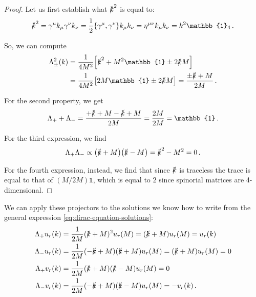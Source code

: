 \documentclass[main.tex]{subfiles}
\begin{document}
\begin{proof}
Let us first establish what \(\slashed{k}^2\) is equal to: 
%
\begin{align}
\slashed{k}^2 =
\gamma^{\mu } k_{\mu } \gamma^{\nu } k_{\nu }
= \frac{1}{2} \qty{\gamma^{\mu }, \gamma^{\nu }}k_{\mu } k_{\nu }
= \eta^{\mu \nu } k_{\mu } k_{\nu }
= k^2 \mathbb{1}_{4}
\,.
\end{align}

So, we can compute 
%
\begin{align}
\Lambda_{\pm}^2 (k) &= \frac{1}{4 M^2}\qty[\slashed{k}^2 + M^2 \mathbb{1} \pm 2 \slashed{k} M]  \\
&= \frac{1}{4 M^2} \qty[2 M \mathbb{1} \pm 2 \slashed{k}M] = \frac{\pm \slashed{k} + M}{2M}
\,.
\end{align}

For the second property, we get 
%
\begin{align}
\Lambda_{+} + \Lambda_{-} = \frac{+ \slashed{k} + M - \slashed{k} + M}{2M} = \frac{2M}{2M} = \mathbb{1} 
\,.
\end{align}

For the third expression, we find 
%
\begin{align}
\Lambda_{+} \Lambda_{-} \propto \qty(\slashed{k} + M) \qty(\slashed{k} - M) = \slashed{k}^2 - M^2 = 0
\,.
\end{align}

For the fourth expression, instead, we find that since \(\slashed{k}\) is traceless the trace is equal to that of \((M / 2 M)  \mathbb{1}\), which is equal to \(2\) since spinorial matrices are 4-dimensional.
\end{proof}

We can apply these projectors to the solutions we know how to write from the general expression \eqref{eq:dirac-equation-solutions}: 
%
\begin{align}
\Lambda_{+} u_r (k) &= \frac{1}{2M} (\slashed{k} + M)^2 u_r(M) = (\slashed{k} + M) u_r (M) = u_r(k) \\
\Lambda_{-} u_r (k) &= \frac{1}{2M} (-\slashed{k} + M) (\slashed{k} + M) u_r(M) = (\slashed{k} + M) u_r (M) = 0 \\
\Lambda_{+} v_r (k) &= \frac{1}{2M} (\slashed{k} + M) (\slashed{k} - M) u_r(M) = 0 \\
\Lambda_{-} v_r (k) &= \frac{1}{2M} (-\slashed{k} + M) (\slashed{k} - M) u_r(M) = - v_r(k)
\,.
\end{align}
%
\end{document}
